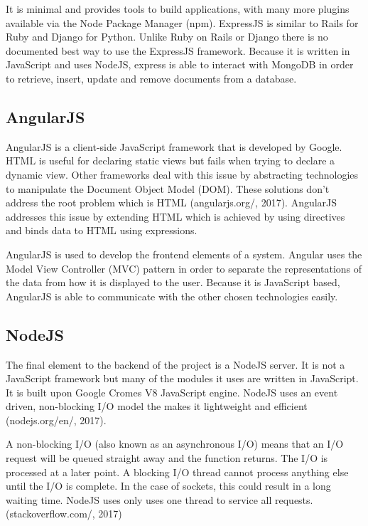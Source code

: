 \documentclass[12pt]{article}
\begin{document}
It is minimal and provides tools to build applications, with many more plugins available via the Node Package Manager (npm). ExpressJS is similar to Rails for Ruby and Django for Python. Unlike Ruby on Rails or Django there is no documented best way to use the ExpressJS framework. Because it is written in JavaScript and uses NodeJS, express is able to interact with MongoDB in order to retrieve, insert, update and remove documents from a database.

\begin{center}
\subsection{AngularJS}
\end{center}
AngularJS is a client-side JavaScript framework that is developed by Google. HTML is useful for declaring static views but fails when trying to declare a dynamic view. Other frameworks deal with this issue by abstracting technologies to manipulate the Document Object Model (DOM). These solutions don’t address the root problem which is HTML (angularjs.org/, 2017). AngularJS addresses this issue by extending HTML which is achieved by using directives and binds data to HTML using expressions.

AngularJS is used to develop the frontend elements of a system. Angular uses the Model View Controller (MVC) pattern in order to separate the representations of the data from how it is displayed to the user. Because it is JavaScript based, AngularJS is able to communicate with the other chosen technologies easily.

\begin{center}
\subsection{NodeJS}
\end{center}
The final element to the backend of the project is a NodeJS server. It is not a JavaScript framework but many of the modules it uses are written in JavaScript. It is built upon Google Cromes V8 JavaScript engine. NodeJS uses an event driven, non-blocking I/O model the makes it lightweight and efficient (nodejs.org/en/, 2017).

A non-blocking I/O (also known as an asynchronous I/O) means that an I/O request will be queued straight away and the function returns. The I/O is processed at a later point. A blocking I/O thread cannot process anything else until the I/O is complete. In the case of sockets, this could result in a long waiting time. NodeJS uses only uses one thread to service all requests. (stackoverflow.com/, 2017)
\end{document}
